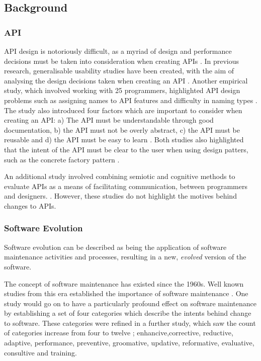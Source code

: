 \documentclass[10pt,twocolumn]{article}
\begin{document}
\subsection{Background}

\subsubsection{API}
API design is notoriously difficult, as a myriad of design and performance decisions must be taken into consideration when creating APIs \cite{bloch2008effective} \cite{afonso2012evaluating} \cite{stylos2006comparing}. In previous research, generalisable usability studies have been created, with the aim of analysing the design decisions taken when creating an API \cite{stylos2006comparing}. Another empirical study, which involved working with 25 programmers, highlighted API design problems such as assigning names to API features and difficulty in naming types \cite{shi2011empirical}. The study also introduced four factors which are important to consider when creating an API: a) The API  must be understandable through good documentation, b) the API must not be overly abstract, c) the API must be reusable and d) the API must be easy to learn \cite{shi2011empirical}. Both studies also highlighted that the intent of the API must be clear to the user when using design patters, such as the concrete factory pattern \cite{shi2011empirical} \cite{stylos2006comparing}.

An additional study involved combining semiotic and cognitive methods to evaluate APIs as a means of facilitating communication, between programmers and designers. \cite{afonso2012evaluating}. However, these studies do not highlight the motives behind changes to APIs.


\subsubsection{Software Evolution}

Software evolution can be described as being the application of software maintenance activities and processes, resulting in a new, \textit{evolved} version of the software.

The concept of software maintenance has existed since the 1960s. Well known studies from this era established the importance of software maintenance \cite{canning1972maintenance}\cite{lientz1980software}. One study would go on to have a particularly profound effect on software maintenance by establishing a set of four categories which describe the intents behind change to software. These categories were refined in a further study, which saw the count of categories increase from four to twelve \cite{chapin2001types}; enhancive,corrective, reductive, adaptive, performance, preventive, groomative, updative, reformative, evaluative, consultive and training.
\end{document}
